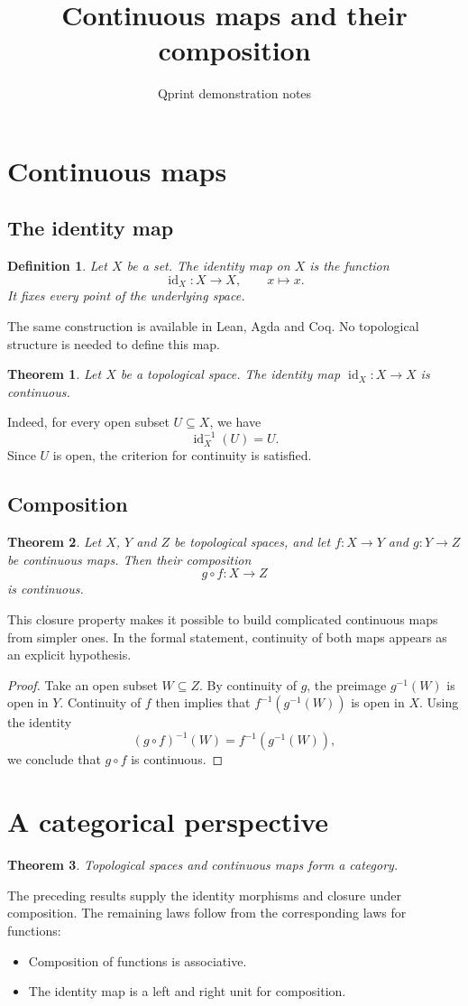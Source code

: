 \documentclass{article}
\title{Continuous maps and their composition}
\author{Qprint demonstration notes}
\newcommand{\bpnode}[1]{}
\newtheorem{definition}{Definition}
\newtheorem{theorem}{Theorem}
\newtheorem{proof}{Proof}
\begin{document}
\section{Continuous maps}
\subsection{The identity map}
\bpnode{identity}
\begin{definition}
Let $X$ be a set. The \emph{identity map} on $X$ is the function
\[
  \operatorname{id}_X : X \longrightarrow X, \qquad x \longmapsto x.
\]
It fixes every point of the underlying space.
\end{definition}

The same construction is available in Lean, Agda and Coq. No topological
structure is needed to define this map.

\bpnode{continuous-id}
\begin{theorem}
Let $X$ be a topological space. The identity map
$\operatorname{id}_X : X \to X$ is continuous.
\end{theorem}

Indeed, for every open subset $U \subseteq X$, we have
\[
  \operatorname{id}_X^{-1}(U) = U.
\]
Since $U$ is open, the criterion for continuity is satisfied.

\subsection{Composition}
\bpnode{continuous-comp}
\begin{theorem}
Let $X$, $Y$ and $Z$ be topological spaces, and let
$f : X \to Y$ and $g : Y \to Z$ be continuous maps.
Then their composition
\[
  g \circ f : X \longrightarrow Z
\]
is continuous.
\end{theorem}

This closure property makes it possible to build complicated continuous
maps from simpler ones. In the formal statement, continuity of both
maps appears as an explicit hypothesis.

\bpnode{composition-proof}
\begin{proof}
Take an open subset $W \subseteq Z$. By continuity of $g$,
the preimage $g^{-1}(W)$ is open in $Y$.
Continuity of $f$ then implies that $f^{-1}(g^{-1}(W))$ is open in $X$.
Using the identity
\[
  (g \circ f)^{-1}(W) = f^{-1}(g^{-1}(W)),
\]
we conclude that $g \circ f$ is continuous.
\end{proof}

\section{A categorical perspective}
\bpnode{top-category}
\begin{theorem}
Topological spaces and continuous maps form a category.
\end{theorem}

The preceding results supply the identity morphisms and closure under
composition. The remaining laws follow from the corresponding laws
for functions:
\begin{itemize}
\item Composition of functions is associative.
\item The identity map is a left and right unit for composition.
\end{itemize}
\end{document}
